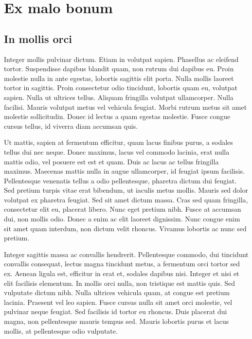 \chapter{Ex malo bonum}

\section{In mollis orci}
Integer mollis pulvinar dictum. Etiam in volutpat sapien. Phasellus ac eleifend tortor. Suspendisse dapibus blandit quam, non rutrum dui dapibus eu. Proin molestie nulla in ante egestas, lobortis sagittis elit porta. Nulla mollis laoreet tortor in sagittis. Proin consectetur odio tincidunt, lobortis quam eu, volutpat sapien. Nulla ut ultrices tellus. Aliquam fringilla volutpat ullamcorper. Nulla facilisi. Mauris volutpat metus vel vehicula feugiat. Morbi rutrum metus sit amet molestie sollicitudin. Donec id lectus a quam egestas molestie. Fusce congue cursus tellus, id viverra diam accumsan quis.

Ut mattis, sapien at fermentum efficitur, quam lacus finibus purus, a sodales tellus dui nec neque. Donec maximus, lacus vel commodo lacinia, erat nulla mattis odio, vel posuere est est et quam. Duis ac lacus ac tellus fringilla maximus. Maecenas mattis nulla in augue ullamcorper, id feugiat ipsum facilisis. Pellentesque venenatis tellus a odio pellentesque, pharetra dictum dui feugiat. Sed pretium turpis vitae erat bibendum, ut iaculis metus mollis. Mauris sed dolor volutpat ex pharetra feugiat. Sed sit amet dictum massa. Cras sed quam fringilla, consectetur elit eu, placerat libero. Nunc eget pretium nibh. Fusce at accumsan dui, non mollis odio. Donec a enim ac elit laoreet dignissim. Nunc congue enim sit amet quam interdum, non dictum velit rhoncus. Vivamus lobortis ac nunc sed pretium.

Integer sagittis massa ac convallis hendrerit. Pellentesque commodo, dui tincidunt convallis consequat, lectus magna tincidunt metus, a fermentum orci tortor sed ex. Aenean ligula est, efficitur in erat et, sodales dapibus nisi. Integer et nisi et elit facilisis elementum. In mollis orci nulla, non tristique est mattis quis. Sed vulputate dictum nibh. Nulla ultrices vehicula quam, at congue est pretium lacinia. Praesent vel leo sapien. Fusce cursus nulla sit amet orci molestie, vel pulvinar neque feugiat. Sed facilisis id tortor eu rhoncus. Duis placerat dui magna, non pellentesque mauris tempus sed. Mauris lobortis purus et lacus mollis, at pellentesque odio vulputate.

